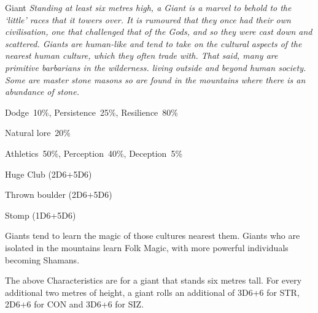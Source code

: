 \begin{monsterbox}{Giant}
	\textit{Standing at least six metres high, a Giant is a marvel to behold to the ‘little’ races that it towers over. It is rumoured that they once had their own civilisation, one that challenged that of the Gods, and so they were cast down and scattered. Giants are human-like and tend to take on the cultural aspects of the nearest human culture, which they often trade with. That said, many are primitive barbarians in the wilderness. living outside and beyond human society. Some are master stone masons so are found in the mountains where there is an abundance of stone. }\\
	\rpghline
	\basics[%
        hitpoints  = 44,
	majorwound = 22,
	damagemodifier = +5D6,
	powerpoints = 11,
	movementrate = 30m,
	armor = Tough Hide (3AP),
	plunderrating = 1-5
	]
	\rpghline%
	\stats[ %
		STR = 9D6+18 (49),
		CON = 6D6+18 (39),
		DEX = 2D6+3  (10),
		SIZ = 9D6+18 (49),
		INT = 3D6    (11),
		POW = 3D6    (11),
		CHA = 2D6    (7)
	]
	\rpghline%
	\begin{rpg-monsteraction}[Resistances]
		Dodge~10\%, Persistence~25\%, Resilience~80\%
	\end{rpg-monsteraction}
	\begin{rpg-monsteraction}[Knowledge]
    		Natural lore~20\%
	\end{rpg-monsteraction}
	\begin{rpg-monsteraction}[Practical]
		Athletics~50\%, Perception~40\%, Deception~5\%
	\end{rpg-monsteraction}
	\begin{rpg-monsteraction}
		Huge Club (2D6+5D6)
	\end{rpg-monsteraction}
	\begin{rpg-monsteraction}
		Thrown boulder (2D6+5D6)
	\end{rpg-monsteraction}
	\begin{rpg-monsteraction}
		Stomp (1D6+5D6)
	\end{rpg-monsteraction}
	\begin{rpg-monsteraction}[Supernatural]
		Giants tend to learn the magic of those cultures nearest them. Giants who are isolated in the mountains learn Folk Magic, with more powerful individuals becoming Shamans.
	\end{rpg-monsteraction}
	\begin{rpg-monsteraction}
		The above Characteristics are for a giant that stands six metres tall. For every additional two metres of height, a giant rolls an additional of 3D6+6 for STR, 2D6+6 for CON and 3D6+6 for SIZ.
	\end{rpg-monsteraction}
\end{monsterbox}

